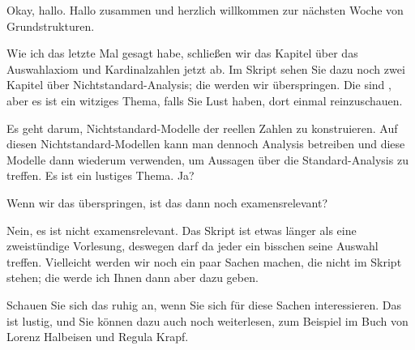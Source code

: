 \begin{spoken-clean}[00:00:00 - 00:01:07]
Okay, hallo. Hallo zusammen und herzlich willkommen zur nächsten Woche von Grundstrukturen.

Wie ich das letzte Mal gesagt habe, schließen wir das Kapitel über das Auswahlaxiom und Kardinalzahlen jetzt ab. Im Skript sehen Sie dazu noch zwei Kapitel über Nichtstandard-Analysis; die werden wir überspringen. Die sind , aber es ist ein witziges Thema, falls Sie Lust haben, dort einmal reinzuschauen.

Es geht darum, Nichtstandard-Modelle der reellen Zahlen zu konstruieren. Auf diesen Nichtstandard-Modellen kann man dennoch Analysis betreiben und diese Modelle dann wiederum verwenden, um Aussagen über die Standard-Analysis zu treffen. Es ist ein lustiges Thema. Ja?
\end{spoken-clean}

\begin{student-interaction}[Studentenfrage]
Wenn wir das überspringen, ist das dann noch examensrelevant?
\end{student-interaction}

\begin{spoken-clean}[00:01:07 - 00:01:25]
Nein, es ist nicht examensrelevant. Das Skript ist etwas länger als eine zweistündige Vorlesung, deswegen darf da jeder ein bisschen seine Auswahl treffen. Vielleicht werden wir noch ein paar Sachen machen, die nicht im Skript stehen; die werde ich Ihnen dann aber dazu geben.

Schauen Sie sich das ruhig an, wenn Sie sich für diese Sachen interessieren. Das ist lustig, und Sie können dazu auch noch weiterlesen, zum Beispiel im Buch von Lorenz Halbeisen und Regula Krapf.
\end{spoken-clean}

